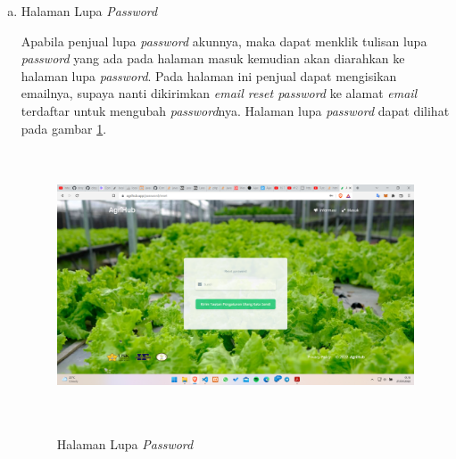 \begin{enumerate}
\begin{enumerate}[a.]
		\newpage
		\item Halaman Lupa \textit{Password}
		\par Apabila penjual lupa \textit{password} akunnya, maka dapat menklik tulisan lupa \textit{password} yang ada pada halaman masuk kemudian akan diarahkan ke halaman lupa \textit{password}. Pada halaman ini penjual dapat mengisikan emailnya, supaya nanti dikirimkan \textit{email reset password} ke alamat \textit{email} terdaftar untuk mengubah \textit{password}nya. Halaman lupa \textit{password} dapat dilihat pada gambar \ref*{lupa_password}.
		\begin{figure}[H]
			\centering
			{\includegraphics [width = 13.5cm, height= 8cm]{gambar/lupa_password}}
			\caption{Halaman Lupa \textit{Password}}
			\label{lupa_password}
		\end{figure}


\end{enumerate}
\end{enumerate}
